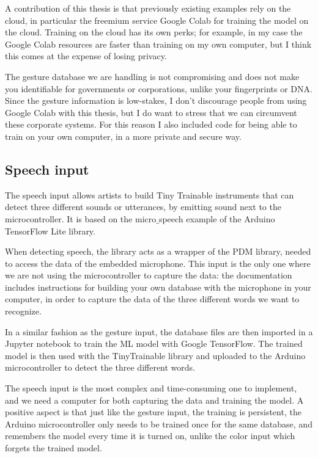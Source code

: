 A contribution of this thesis is that previously existing examples rely on the cloud, in particular the freemium service Google Colab for training the model on the cloud. Training on the cloud has its own perks; for example, in my case the Google Colab resources are faster than training on my own computer, but I think this comes at the expense of losing privacy.

The gesture database we are handling is not compromising and does not make you identifiable for governments or corporations, unlike your fingerprints or DNA. Since the gesture information is low-stakes, I don't discourage people from using Google Colab with this thesis, but I do want to stress that we can circumvent these corporate systems. For this reason I also included code for being able to train on your own computer, in a more private and secure way.

\subsection{Speech input}

The speech input allows artists to build Tiny Trainable instruments that can detect three different sounds or utterances, by emitting sound next to the microcontroller.  It is based on the micro$\_$speech example of the Arduino TensorFlow Lite library.

When detecting speech, the library acts as a wrapper of the PDM library, needed to access the data of the embedded microphone. This input is the only one where we are not using the microcontroller to capture the data: the documentation includes instructions for building your own database with the microphone in your computer, in order to capture the data of the three different words we want to recognize. 

In a similar fashion as the gesture input, the database files are then imported in a Jupyter notebook to train the \acrshort{ML} model with Google TensorFlow. The trained model is then used with the TinyTrainable library and uploaded to the Arduino microcontroller to detect the three different words.

The speech input is the most complex and time-consuming one to implement, and we need a computer for both capturing the data and training the model. A positive aspect is that just like the gesture input, the training is persistent, the Arduino microcontroller only needs to be trained once for the same database, and remembers the model every time it is turned on, unlike the color input which forgets the trained model.

